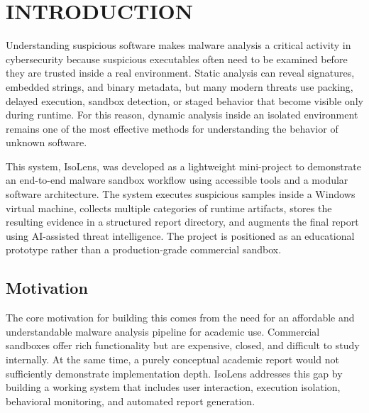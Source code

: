 \documentclass[a4paper,12pt,oneside]{report}
\newcommand{\changefont}{%
\fontsize{10}{12}\selectfont
}
\begin{document}
\newpage


\newpage
\renewcommand\thepage{\arabic{page}}
\clearpage
\setlength{\headheight}{15pt}
\pagestyle{fancy}
\fancyhf{}
\lhead{\changefont\thechapter.\leftmark}
\rhead{}
\cfoot{\thepage}
\renewcommand{\chaptermark}[1]{\markboth{#1}{}}
\renewcommand{\sectionmark}[1]{\markright{#1}{}}
\renewcommand{\headrulewidth}{0.5pt}
\setcounter{page}{1}

\chapter{INTRODUCTION}
\noindent
Understanding suspicious software makes malware analysis a critical activity in cybersecurity because suspicious executables often need to be examined before they are trusted inside a real environment. Static analysis can reveal signatures, embedded strings, and binary metadata, but many modern threats use packing, delayed execution, sandbox detection, or staged behavior that become visible only during runtime. For this reason, dynamic analysis inside an isolated environment remains one of the most effective methods for understanding the behavior of unknown software.

\par

\par

This system, IsoLens, was developed as a lightweight mini-project to demonstrate an end-to-end malware sandbox workflow using accessible tools and a modular software architecture. The system executes suspicious samples inside a Windows virtual machine, collects multiple categories of runtime artifacts, stores the resulting evidence in a structured report directory, and augments the final report using AI-assisted threat intelligence. The project is positioned as an educational prototype rather than a production-grade commercial sandbox.

\section{Motivation}
\noindent
The core motivation for building this comes from the need for an affordable and understandable malware analysis pipeline for academic use. Commercial sandboxes offer rich functionality but are expensive, closed, and difficult to study internally. At the same time, a purely conceptual academic report would not sufficiently demonstrate implementation depth. IsoLens addresses this gap by building a working system that includes user interaction, execution isolation, behavioral monitoring, and automated report generation.
\end{document}
